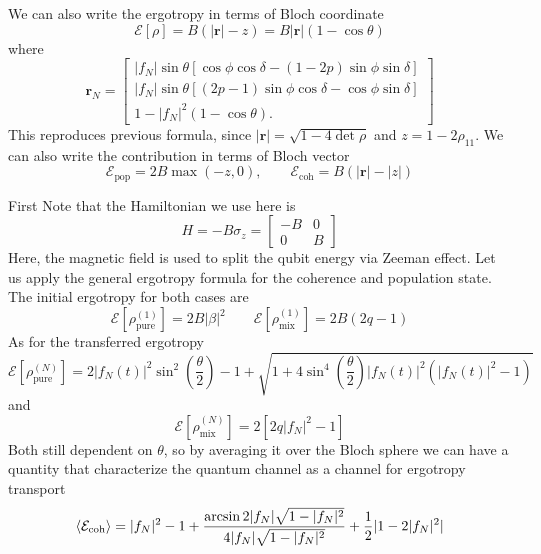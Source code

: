 \documentclass[../../../main.tex]{subfiles}
\begin{document}
We can also write the ergotropy in terms of Bloch coordinate
\begin{equation*}
  \mathcal{E}[\rho] = B(|\mathbf{r}|-z) = B|\mathbf{r}|(1-\cos \theta)
\end{equation*}
where
\begin{equation*}
  \mathbf{r}_N
  =
  \begin{bmatrix}
    |f_N|\sin\theta
    \left[
      \cos\phi\cos\delta
      -(1-2p)\sin\phi\sin\delta
    \right] \\
    |f_N|\sin\theta
    \left[
      (2p-1)\sin\phi\cos\delta
      -\cos\phi\sin\delta
    \right] \\
    1-|f_N|^2(1-\cos\theta).
  \end{bmatrix}
\end{equation*}
This reproduces previous formula, since $|\mathbf{r}| = \sqrt{1-4\det\rho}$ and $z = 1-2\rho_{11}$.
We can also write the contribution in terms of Bloch vector
\begin{equation*}
\mathcal E_{\mathrm{pop}}=2B\max(-z,0),\qquad
\mathcal E_{\mathrm{coh}}=B\left(|\mathbf r|-|z|\right)
\end{equation*}

First Note that the Hamiltonian we use here is
\begin{equation*}
  H = -B\sigma_z=\begin{bmatrix}
    -B & 0 \\
    0  & B
  \end{bmatrix}
\end{equation*}
Here, the magnetic field is used to split the qubit energy via Zeeman effect.
Let us apply the general ergotropy formula for the coherence and population state.
The initial ergotropy for both cases are
\begin{equation*}
  \mathcal{E}\left[ \rho_{\text{pure}}^{(1)} \right]  = 2B|\beta|^2 \qquad
  \mathcal{E}\left[ \rho_{\text{mix}}^{(1)} \right] = 2B (2q-1)
\end{equation*}
As for the transferred ergotropy
\begin{equation*}
  \mathcal{E}\left[ \rho_{\text{pure}}^{(N)} \right]= 2|f_N(t)|^2\sin^2\left(\frac{\theta}{2}\right)-1+\sqrt{1+4\sin^4\left(\frac{\theta}{2}\right)|f_N(t)|^2\left(|f_N(t)|^2-1\right)}
\end{equation*}
and
\begin{equation*}
  \mathcal{E}\left[ \rho_{\text{mix}}^{(N)} \right] = 2[2q |f_N|^2 - 1]
\end{equation*}
Both still dependent on $\theta$, so by averaging it over the Bloch sphere we can have a quantity that characterize the quantum channel as a channel for ergotropy transport
\begin{equation*}
  \braket{\mathcal{E}_\text{coh}} = |f_N|^2-1 + \frac{\arcsin 2|f_N|\sqrt{1-|f_N|^2 }}{4|f_N|\sqrt{1-|f_N|^2}} + \frac{1 }{2} |1-2|f_N|^2 |
\end{equation*}
\end{document}
